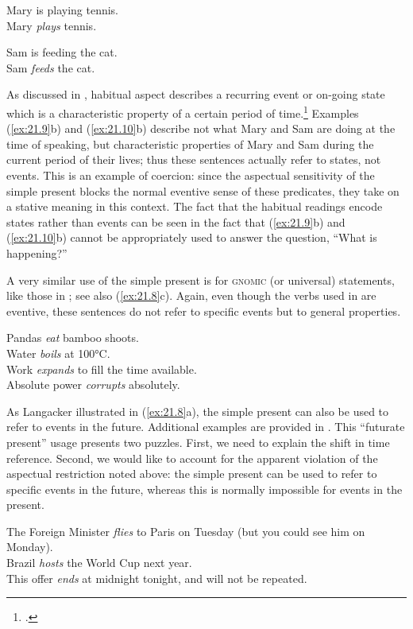\ea \label{ex:21.9}
\ea  Mary is playing tennis.\\
\ex Mary \textit{plays} tennis.
                       \z
\z

\ea \label{ex:21.10}
\ea  Sam is feeding the cat.\\
\ex Sam \textit{feeds} the cat.
                       \z
\z

As discussed in , habitual aspect describes a recurring event or on-going state which is a characteristic property of a certain period of time.\footnote{\citet[27--28]{Comrie1976}.} Examples (\ref{ex:21.9}b) and (\ref{ex:21.10}b) describe not what Mary and Sam are doing at the time of speaking, but characteristic properties of Mary and Sam during the current period of their lives; thus these sentences actually refer to states, not events. This is an example of coercion: since the aspectual sensitivity of the simple present blocks the normal eventive sense of these predicates, they take on a stative meaning in this context. The fact that the habitual readings encode states rather than events can be seen in the fact that (\ref{ex:21.9}b) and (\ref{ex:21.10}b) cannot be appropriately used to answer the question, “What is happening?”


A very similar use of the simple present is for \textsc{gnomic} (or universal) statements, like those in ; see also (\ref{ex:21.8}c). Again, even though the verbs used in  are eventive, these sentences do not refer to specific events but to general properties.


\ea \label{ex:21.11}
\ea  Pandas \textit{eat} bamboo shoots.\\
\ex Water \textit{boils} at 100°C.\\
\ex Work \textit{expands} to fill the time available.\\
\ex Absolute power \textit{corrupts} absolutely.
                       \z
\z

As Langacker illustrated in (\ref{ex:21.8}a), the simple present can also be used to refer to events in the future. Additional examples are provided in . This “futurate present” usage presents two puzzles. First, we need to explain the shift in time reference. Second, we would like to account for the apparent violation of the aspectual restriction noted above: the simple present can be used to refer to specific events in the future, whereas this is normally impossible for events in the present.

\ea \label{ex:21.12}
\ea  The Foreign Minister \textit{flies} to Paris on Tuesday (but you could see him on Monday).\\
\ex Brazil \textit{hosts} the World Cup next year.\\
\ex This offer \textit{ends} at midnight tonight, and will not be repeated.
                       \z
\z

